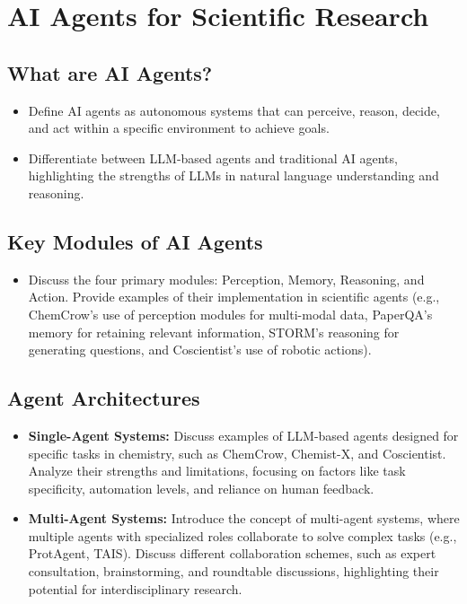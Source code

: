 \documentclass{article}
\begin{document}
\section{AI Agents for Scientific Research}

\subsection{What are AI Agents?}
\begin{itemize}
    \item Define AI agents as autonomous systems that can perceive, reason, decide, and act within a specific environment to achieve goals.
    \item Differentiate between LLM-based agents and traditional AI agents, highlighting the strengths of LLMs in natural language understanding and reasoning.
\end{itemize}

\subsection{Key Modules of AI Agents}
\begin{itemize}
    \item Discuss the four primary modules: Perception, Memory, Reasoning, and Action. Provide examples of their implementation in scientific agents (e.g., ChemCrow's use of perception modules for multi-modal data, PaperQA's memory for retaining relevant information, STORM's reasoning for generating questions, and Coscientist's use of robotic actions).
\end{itemize}

\subsection{Agent Architectures}
\begin{itemize}
    \item \textbf{Single-Agent Systems:} Discuss examples of LLM-based agents designed for specific tasks in chemistry, such as ChemCrow, Chemist-X, and Coscientist. Analyze their strengths and limitations, focusing on factors like task specificity, automation levels, and reliance on human feedback.
    \item \textbf{Multi-Agent Systems:} Introduce the concept of multi-agent systems, where multiple agents with specialized roles collaborate to solve complex tasks (e.g., ProtAgent, TAIS). Discuss different collaboration schemes, such as expert consultation, brainstorming, and roundtable discussions, highlighting their potential for interdisciplinary research.
\end{itemize}
\end{document}
